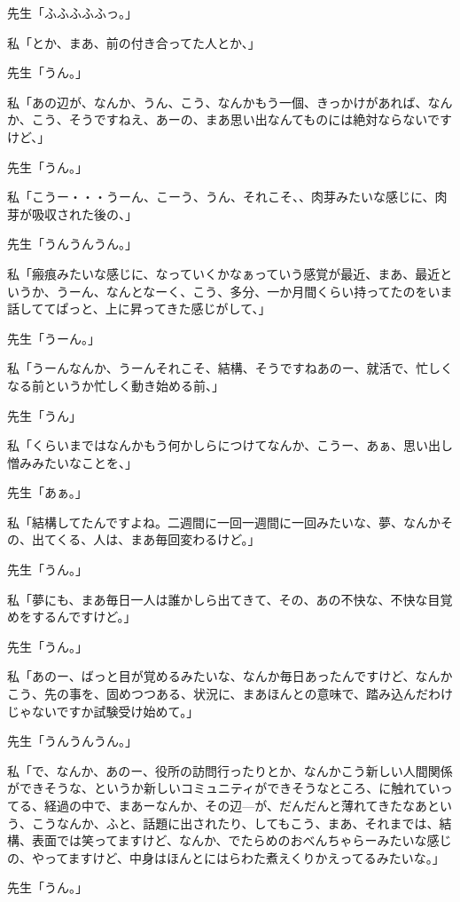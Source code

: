 \documentclass[b5j,twoside,twocolumn]{utarticle}
\begin{document}
\begin{description}
\item 先生「ふふふふふっ。」
\item 私「とか、まあ、前の付き合ってた人とか、」
\item 先生「うん。」
\item 私「あの辺が、なんか、うん、こう、なんかもう一個、きっかけがあれば、なんか、こう、そうですねえ、あーの、まあ思い出なんてものには絶対ならないですけど、」
\item 先生「うん。」
\item 私「こうー・・・うーん、こーう、うん、それこそ、、肉芽みたいな感じに、肉芽が吸収された後の、」
\item 先生「うんうんうん。」
\item 私「瘢痕みたいな感じに、なっていくかなぁっていう感覚が最近、まあ、最近というか、うーん、なんとなーく、こう、多分、一か月間くらい持ってたのをいま話しててぱっと、上に昇ってきた感じがして、」
\item 先生「うーん。」
\item 私「うーんなんか、うーんそれこそ、結構、そうですねあのー、就活で、忙しくなる前というか忙しく動き始める前、」
\item 先生「うん」
\item 私「くらいまではなんかもう何かしらにつけてなんか、こうー、あぁ、思い出し憎みみたいなことを、」
\item 先生「あぁ。」
\item 私「結構してたんですよね。二週間に一回一週間に一回みたいな、夢、なんかその、出てくる、人は、まあ毎回変わるけど。」
\item 先生「うん。」
\item 私「夢にも、まあ毎日一人は誰かしら出てきて、その、あの不快な、不快な目覚めをするんですけど。」
\item 先生「うん。」
\item 私「あのー、ばっと目が覚めるみたいな、なんか毎日あったんですけど、なんかこう、先の事を、固めつつある、状況に、まあほんとの意味で、踏み込んだわけじゃないですか試験受け始めて。」
\item 先生「うんうんうん。」
\item 私「で、なんか、あのー、役所の訪問行ったりとか、なんかこう新しい人間関係ができそうな、というか新しいコミュニティができそうなところ、に触れていってる、経過の中で、まあーなんか、その辺—が、だんだんと薄れてきたなあという、こうなんか、ふと、話題に出されたり、してもこう、まあ、それまでは、結構、表面では笑ってますけど、なんか、でたらめのおべんちゃらーみたいな感じの、やってますけど、中身はほんとにはらわた煮えくりかえってるみたいな。」
\item 先生「うん。」

\end{description}
\end{document}
